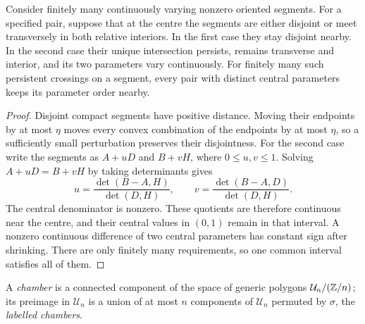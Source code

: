 \begin{lemma}
\label{lem:wall-segment-stability}
Consider finitely many continuously varying nonzero oriented segments.
For a specified pair, suppose that at the centre the segments are either
disjoint or meet transversely in both relative interiors. In the first case
they stay disjoint nearby. In the second case their unique intersection
persists, remains transverse and interior, and its two parameters vary
continuously. For finitely many such persistent crossings on a segment,
every pair with distinct central parameters keeps its parameter order nearby.
\end{lemma}
\begin{proof}
Disjoint compact segments have positive distance. Moving their endpoints by
at most $\eta$ moves every convex combination of the endpoints by at most
$\eta$, so a sufficiently small perturbation preserves their disjointness.
For the second case write the segments as $A+uD$ and $B+vH$, where
$0\leq u,v\leq1$. Solving $A+uD=B+vH$ by taking determinants gives
\begin{equation}\label{wallgeo:parameters}
 u=\frac{\det(B-A,H)}{\det(D,H)},\qquad
 v=\frac{\det(B-A,D)}{\det(D,H)}.
\end{equation}
The central denominator is nonzero. These quotients are therefore continuous
near the centre, and their central values in $(0,1)$ remain in that interval.
A nonzero continuous difference of two central parameters has constant sign
after shrinking. There are only finitely many requirements, so one common
interval satisfies all of them.
\end{proof}

\begin{definition}[chambers]\label{def:chamber}
A \emph{chamber} is a connected component of the space of generic polygons
$\mathcal U_n/(\mathbb Z/n)$; its preimage in $\mathcal U_n$ is a union of at most
$n$ components of $\mathcal U_n$ permuted by $\sigma$, the \emph{labelled
chambers}.
\end{definition}

